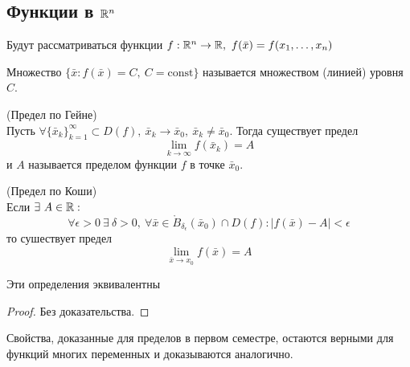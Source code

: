 \subsection{Функции в $\mathbb{R}^n$}
Будут рассматриваться функции $f: \mathbb{R}^n\to \mathbb{R},\ f(\bar{x})=f(x_1, \dots, x_n)$
\begin{definition}
    Множество $\{\bar{x}: f(\bar{x})=C,\ C=\text{const}\}$ называется множеством (линией) уровня $C$.
\end{definition} 
\begin{definition} (Предел по Гейне)\\
    Пусть $\forall \{\bar{x}_k\}_{k=1}^{\infty}\subset D(f),\ \bar{x}_k\to \bar{x}_0,\ \bar{x}_k\ne \bar{x}_0$. Тогда существует предел
    \[\lim\limits_{k\to \infty}f(\bar{x}_k)=A\]
    и $A$ называется пределом функции $f$ в точке $\bar{x}_0$.
\end{definition} 
\begin{definition} (Предел по Коши)\\
    Если $\exists\ A\in \mathbb{R}:$
    \[\forall \epsilon>0\ \exists\ \delta>0,\ \forall \bar{x}\in \mathring{B}_{\delta_\epsilon}(\bar{x}_0)\cap D(f): |f(\bar{x})-A|<\epsilon\]
    то сушествует предел 
    \[\lim\limits_{\bar{x}\to x_0}f(\bar{x})=A\]
\end{definition} 
\begin{theorem}
    Эти определения эквивалентны
\end{theorem} 
\begin{proof}
    Без доказательства.
\end{proof} 
\begin{comm}
    Свойства, доказанные для пределов в первом семестре, остаются верными для функций многих переменных и доказываются аналогично.
\end{comm} 